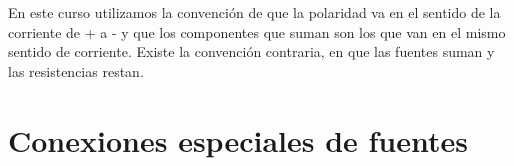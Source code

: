 \iffalse
\begin{example}[Ejemplo de aplicación de LKC]
\begin{center}
\begin{circuitikz}[american]
\draw

	(5,3) to (0,3) to [V, l={$V_\textrm{i}$},i=$i_{t}$] (0,6) 
   	(0,6) to (4,6) 
	(3,3) node[label={below:$a$}] {} to [R,i=$i_1$,l={$R_1$}] (3,6) node[label={above:$b$}] 
    (4,6) to(5,6)
    (5,3) to [R,i=$i_2$,l={$R_2$}] (5,6) ;

\end{circuitikz}
\end{center}
Debido a que se trata de un circuito en paralelo, el voltaje de $V_i$ se mantiene tanto en $R_1$ como en $R_2$, pero la corriente se divide en el nodo $a$, de tal forma que:

\begin {equation*}
i_{t} = i_1+ i_2 
\end {equation*}

Aplicando LKC, siendo: \[
\sum i=0
\]Se llega a:
\begin {equation*}
i_1+ i_2-i_{t}=0 
\end {equation*}

Ya que la ley de Kirchoff de corriente plantea que la corriente de salida es la misma que la de llegada, siendo el nodo $a$ donde se segmenta y en el nodo $b$ se vuelven a unir.
Aplicando la ley de Ohm, la ecuación queda:

\begin {equation*}
\frac{V_{1}}{R_1}+\frac{V_{2}}{R_2}-\frac {V_{i}} {R_t}=0
\end {equation*}
Siendo:
\begin {equation*}
R_t= \frac{R_1*R_2}{R_1+R_2}
\end {equation*}


\end{example}
\fi
\begin{remark}
    En este curso utilizamos la convención de que la polaridad va en el sentido de la corriente de + a - y que los componentes que suman son los que van en el mismo sentido de corriente. Existe la convención contraria, en que las fuentes suman y las resistencias restan.
\end{remark}

\section{Conexiones especiales de fuentes}
